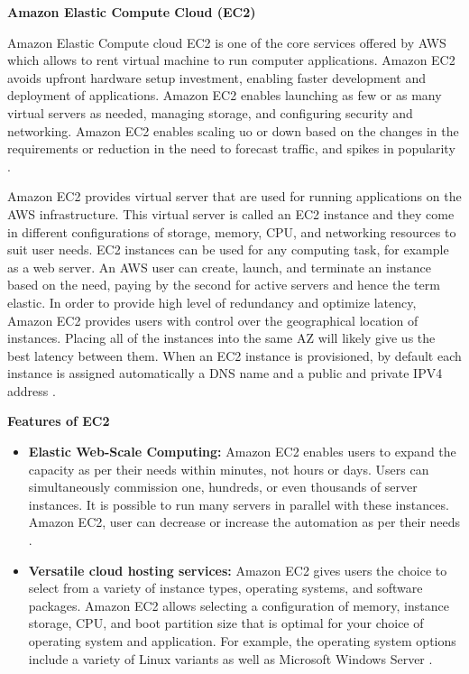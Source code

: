 \textbf{Amazon Elastic Compute Cloud (EC2)}

\par Amazon Elastic Compute cloud EC2 is one of the core services offered by AWS which allows to rent virtual machine to run computer applications. Amazon EC2 avoids upfront hardware setup investment, enabling faster development and deployment of applications. Amazon EC2 enables launching as few or as many virtual servers as needed, managing storage, and configuring security and networking. Amazon EC2 enables scaling uo or down based on the changes in the requirements or reduction in the need to forecast traffic, and spikes in popularity \cite{27}.

\par Amazon EC2 provides virtual server that are used for running applications on the AWS infrastructure. This virtual server is called an EC2 instance and they come in different configurations of storage, memory, CPU, and networking resources to suit user needs. EC2 instances can be used for any computing task, for example as a web server. An AWS user can create, launch, and terminate an instance based on the need, paying by the second for active servers and hence the term elastic. In order to provide high level of redundancy and optimize latency, Amazon EC2 provides users with control over the geographical location of instances. Placing all of the instances into the same AZ will likely give us the best latency between them. When an EC2 instance is provisioned, by default each instance is assigned automatically a DNS name and a public and private IPV4 address \cite{28}.


\textbf{Features of EC2}
\begin{itemize}
    \item \textbf{Elastic Web-Scale Computing:} Amazon EC2 enables users to expand the capacity as per their needs within minutes, not hours or days.
    Users can simultaneously commission one, hundreds, or even thousands of server instances.
    It is possible to run many servers in
    parallel
    with these instances.
    Amazon EC2, user can decrease or increase the automation as per their needs \cite{29}.
\end{itemize}

\begin{itemize}
    \item \textbf{Versatile cloud hosting services:} Amazon EC2 gives users the choice to select from a variety of instance types, operating systems, and software packages.
    Amazon EC2 allows selecting a configuration of memory, instance storage, CPU, and boot partition size that is optimal for your choice of operating system and application. For example, the operating system options include a variety of Linux variants as well as Microsoft Windows Server \cite{29}.
\end{itemize}

